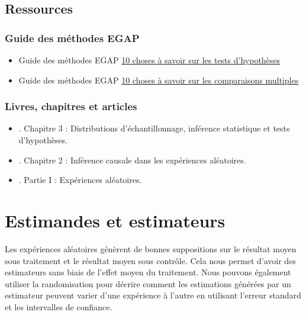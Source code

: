 \documentclass[
  12pt,
]{book}
\begin{document}
\hypertarget{ressources-3}{%
\section{Ressources}\label{ressources-3}}

\hypertarget{guide-des-muxe9thodes-egap-3}{%
\subsection{Guide des méthodes EGAP}\label{guide-des-muxe9thodes-egap-3}}

\begin{itemize}
\item
  Guide des méthodes EGAP \href{https://egap.org/resource/10-things-to-know-about-hypothesis-testing/}{10 choses à savoir sur les tests d'hypothèses}
\item
  Guide des méthodes EGAP \href{https://egap.org/resource/10-things-to-know-about-multiple-comparisons/}{10 choses à savoir sur les comparaisons multiples}
\end{itemize}

\hypertarget{livres-chapitres-et-articles-2}{%
\subsection{Livres, chapitres et articles}\label{livres-chapitres-et-articles-2}}

\begin{itemize}
\item
  \autocite{gerber_field_2012}. Chapitre 3 : Distributions d'échantillonnage, inférence statistique et tests d'hypothèses.
\item
  \autocite{rosenbaum2010design}. Chapitre 2 : Inférence causale dans les expériences aléatoires.
\item
  \autocite{rosenbaum2017observation}. Partie I : Expériences aléatoires.
\end{itemize}

\hypertarget{estimandes-et-estimateurs}{%
\chapter{Estimandes et estimateurs}\label{estimandes-et-estimateurs}}

Les expériences aléatoires génèrent de bonnes suppositions sur le résultat moyen sous traitement et le résultat moyen sous contrôle. Cela nous permet d'avoir des estimateurs sans biais de l'effet moyen du traitement. Nous pouvons également utiliser la randomisation pour décrire comment les estimations générées par un estimateur peuvent varier d'une expérience à l'autre en utilisant l'erreur standard et les intervalles de confiance.
\end{document}
